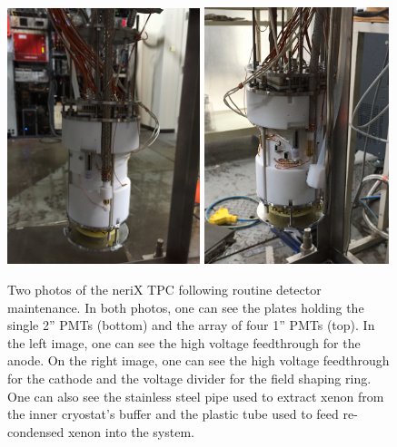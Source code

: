 \begin{figure}[t]
        \centering
	\includegraphics[width=0.50\textwidth]{nerix_tpc_anode}
	\includegraphics[width=0.48\textwidth]{nerix_tpc_cathode}
	\caption{Two photos of the neriX TPC following routine detector maintenance.  In both photos, one can see the plates holding the single 2'' PMTs (bottom) and the array of four 1'' PMTs (top).  In the left image, one can see the high voltage feedthrough for the anode.  On the right image, one can see the high voltage feedthrough for the cathode and the voltage divider for the field shaping ring.  One can also see the stainless steel pipe used to extract xenon from the inner cryostat's buffer and the plastic tube used to feed re-condensed xenon into the system.}
	\label{fig:nerix_tpc}
\end{figure}



